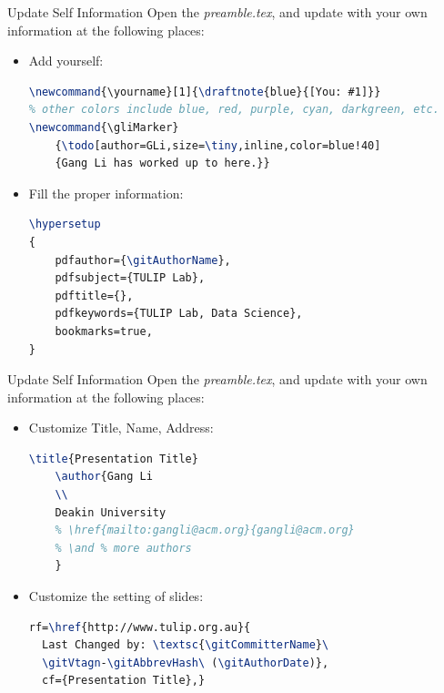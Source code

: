 \documentclass[
 size=14pt,
 paper=smartboard,  %
 mode=present, 		%
 display=slides, 	%
 style=tuliplab,  	%
 pauseslide,
 fleqn,leqno]{powerdot}
\newcommand{\draftnote}[3]{
	\todo[author=#2,color=#1!30,size=\footnotesize]{\textsf{#3}}}
\newcommand{\gliMarker}
	{\todo[author=GLi,size=\tiny,inline,color=blue!40]
	{Gang Li has worked up to here.}}
\begin{document}
\begin{slide}[method=direct]{Update Self Information}
Open the \textit{preamble.tex},
and update with your own information at the following places:

\begin{itemize}
\item
Add yourself:
\begin{lstlisting}[language=TeX]
\newcommand{\yourname}[1]{\draftnote{blue}{[You: #1]}}
% other colors include blue, red, purple, cyan, darkgreen, etc.
\newcommand{\gliMarker}
	{\todo[author=GLi,size=\tiny,inline,color=blue!40]
	{Gang Li has worked up to here.}}
\end{lstlisting}

\item
Fill the proper information:
\begin{lstlisting}[language=TeX]
\hypersetup
{
    pdfauthor={\gitAuthorName},
    pdfsubject={TULIP Lab},
    pdftitle={},
    pdfkeywords={TULIP Lab, Data Science},
    bookmarks=true,
}
\end{lstlisting}
\end{itemize}
\end{slide}

\begin{slide}[toc=,bm=,method=direct]{Update Self Information}
Open the \textit{preamble.tex},
and update with your own information at the following places:
\begin{itemize}
  \item Customize Title, Name, Address:
  \begin{lstlisting}[language=TeX]
  \title{Presentation Title}
    \author{Gang Li
    \\
    Deakin University
    % \href{mailto:gangli@acm.org}{gangli@acm.org}
    % \and % more authors
    }
    \end{lstlisting}
  \item Customize the setting of slides:
  \begin{lstlisting}[language=TeX]
  rf=\href{http://www.tulip.org.au}{
  Last Changed by: \textsc{\gitCommitterName}\
  \gitVtagn-\gitAbbrevHash\ (\gitAuthorDate)},
  cf={Presentation Title},}
  \end{lstlisting}
\end{itemize}
\end{slide}
\end{document}
